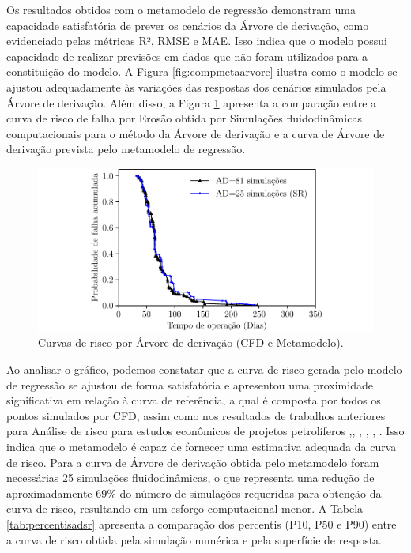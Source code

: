 Os resultados obtidos com o metamodelo de regressão demonstram uma capacidade satisfatória de prever os cenários da Árvore de derivação, como evidenciado pelas métricas R², RMSE e MAE. Isso indica que o modelo possui capacidade de realizar previsões em dados que não foram utilizados para a constituição do modelo. A Figura \ref{fig:compmetaarvore} ilustra como o modelo se ajustou adequadamente às variações das respostas dos cenários simulados pela Árvore de derivação. Além disso, a Figura \ref{fig:AdeAD} apresenta a comparação entre a curva de risco de falha por Erosão obtida por Simulações fluidodinâmicas computacionais para o método da Árvore de derivação e a curva de Árvore de derivação prevista pelo metamodelo de regressão.

\begin{figure}[H] 
    \centering  
    \includegraphics{Figuras/probacADeSR.pdf}  
    \caption{Curvas de risco por Árvore de derivação (CFD e Metamodelo).}  
    \label{fig:AdeAD}  
\end{figure}


Ao analisar o gráfico, podemos constatar que a curva de risco gerada pelo modelo de regressão se ajustou de forma satisfatória e apresentou uma proximidade significativa em relação à curva de referência, a qual é composta por todos os pontos simulados por CFD, assim como nos resultados de trabalhos anteriores para Análise de risco para estudos econômicos de projetos petrolíferos \cite{loschiavo},\cite{steagall}, \cite{santoss2}, \cite{yeten}, \cite{risso1}, \cite{slotte}  . Isso indica que o metamodelo é capaz de fornecer uma estimativa adequada da curva de risco. Para a curva de Árvore de derivação obtida pelo metamodelo foram necessárias 25 simulações fluidodinâmicas, o que representa uma redução de aproximadamente 69\% do número de simulações requeridas para obtenção da curva de risco, resultando em um esforço computacional menor. A Tabela \ref{tab:percentisadsr} apresenta a comparação dos percentis (P10, P50 e P90) entre a curva de risco obtida pela simulação numérica e pela superfície de resposta.

